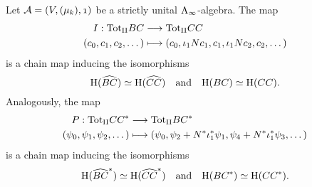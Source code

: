 \documentclass[\MainFolder/Text.tex]{subfiles}
\begin{document}
\begin{Lemma}\label{Lem:LodConCycBi}
Let $\Alg=(V,(\mu_k),\NOne)$ be a strictly unital $\mathrm{A}_\infty$-algebra. The map
\begin{align*}
I: {\mathrm{Tot}_{\mathrm{II}}} BC &\longrightarrow {\mathrm{Tot}_{\mathrm{II}}}CC\\
(c_0, c_1, c_2, \dotsc) &\longmapsto (c_0, \iota_1 N c_1, c_1, \iota_1 N c_2, c_2, \dotsc )
\end{align*}
is a chain map inducing the isomorphisms 
\[\mathrm{H}( \widehat{BC})\simeq \mathrm{H}(\widehat{CC})\quad\text{and}\quad\mathrm{H}(BC)\simeq\mathrm{H}(CC).\] Analogously, the map 
\begin{align*}
P: {\mathrm{Tot}_{\mathrm{II}}}CC^* &\longrightarrow {\mathrm{Tot}_{\mathrm{II}}} BC^* \\
(\psi_0, \psi_1,\psi_2, \dotsc )&\longmapsto (\psi_0, \psi_2 + N^* \iota_1^* \psi_1, \psi_4 + N^* \iota_1^* \psi_3, \dotsc )
\end{align*}
is a chain map inducing the isomorphisms 
\[\mathrm{H}(\widehat{BC}^*) \simeq \mathrm{H}(\widehat{CC}^*)\quad\text{and}\quad\mathrm{H}(BC^*) \simeq \mathrm{H}(CC^*).\]
\end{Lemma}
\end{document}
